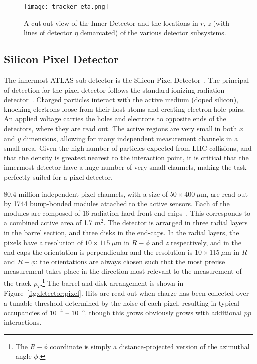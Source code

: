 

\begin{figure}
\centering
\texttt{[image: tracker-eta.png]}
\label{fig:detector:inner-detector-3}
\caption{A cut-out view of the Inner Detector and the locations in $r$, $z$ (with lines of detector $\eta$ demarcated) of the various detector subsystems.}
\end{figure}



\subsection{Silicon Pixel Detector}

The innermost ATLAS sub-detector is the Silicon Pixel Detector~\cite{Pixel,ATLASPaper}. The principal of detection for the pixel detector follows the standard ionizing radiation detector~\cite{Detectors}. Charged particles interact with the active medium (doped silicon), knocking electrons loose from their host atoms and creating electron-hole pairs. An applied voltage carries the holes and electrons to opposite ends of the detectors, where they are read out. The active regions are very small in both $x$ and $y$ dimensions, allowing for many independent measurement channels in a small area. Given the high number of particles expected from LHC collisions, and that the density is greatest nearest to the interaction point, it is critical that the innermost detector have a huge number of very small channels, making the task perfectly suited for a pixel detector.

80.4 million independent pixel channels, with a size of $50 \times 400~\mu$m, are read out by 1744 bump-bonded modules attached to the active sensors. Each of the modules are composed of 16 radiation hard front-end chips~\cite{ATLASPaper}. This corresponds to a combined active area of 1.7 $m^2$. The detector is arranged in three radial layers in the barrel section, and three disks in the end-caps. In the radial layers, the pixels have a resolution of $10 \times 115~\mu$m in $R-\phi$ and $z$ respectively, and in the end-caps the orientation is perpendicular and the resolution is $10 \times 115~\mu$m in $R$ and $R-\phi$: the orientations are always chosen such that the most precise measurement takes place in the direction most relevant to the measurement of the track $p_T$.\footnote{The $R-\phi$ coordinate is simply a distance-projected version of the azimuthal angle $\phi$.} The barrel and disk arrangement is shown in Figure~\ref{fig:detector:pixel}. Hits are read out when charge has been collected over a tunable threshold determined by the noise of each pixel, resulting in typical occupancies of $10^{-4}$ -- $10^{-5}$, though this grows obviously grows with additional $pp$ interactions.

